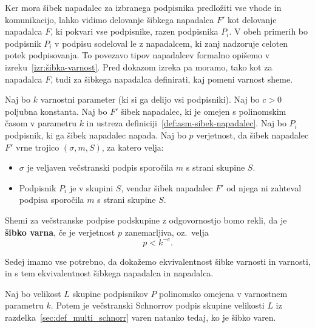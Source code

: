 \documentclass[isrm2, tisk]{fmfdelo}
\begin{document}
Ker mora šibek napadalec za izbranega podpisnika predložiti vse vhode in komunikacijo, lahko vidimo
delovanje šibkega napadalca $F'$ kot delovanje napadalca $F$, ki pokvari vse podpisnike, razen
podpisnika $P_i$. V obeh primerih bo podpisnik $P_i$ v podpisu sodeloval le z napadalcem, ki zanj
nadzoruje celoten potek podpisovanja. To povezavo tipov napadalcev formalno opišemo v
izreku~\ref{izr:šibka-varnost}. Pred dokazom izreka pa moramo, tako kot za napadalca $F$, tudi za
šibkega napadalca definirati, kaj pomeni varnost sheme.

\begin{definicija}
    Naj bo $k$ varnostni parameter (ki si ga delijo vsi podpisniki). Naj bo $c > 0$ poljubna konstanta. 
    Naj bo $F'$ šibek napadalec, ki je omejen s polinomskim časom v parametru $k$ in ustreza
    definiciji~\ref{def:asm-sibek-napadalec}. Naj bo $P_i$ podpisnik, ki ga šibek napadalec napada.
    Naj bo $p$ verjetnost, da šibek napadalec $F'$ vrne trojico $(\sigma, m, S)$, za katero velja: 
    \begin{itemize}
        \item $\sigma$ je veljaven večstranski podpis sporočila $m$ s strani skupine $S$.
        \item Podpisnik $P_i$ je v skupini $S$, vendar šibek napadalec $F'$ od njega ni zahteval
            podpisa sporočila $m$ s strani skupine $S$.
    \end{itemize}
    Shemi za večstranske podpise podskupine z odgovornostjo bomo rekli, da je \textbf{šibko varna},
    če je verjetnost $p$ zanemarljiva, oz.\ velja
    $$ 
    p < k^{-c}.
    $$
\end{definicija}

Sedej imamo vse potrebno, da dokažemo ekvivalentnost šibke varnosti in varnosti, in s tem
ekvivalentnost šibkega napadalca in napadalca.

\begin{izrek}
\label{izr:šibka-varnost}
    Naj bo velikost $L$ skupine podpisnikov $P$ polinomsko omejena v varnostnem parametru $k$.
    Potem je večstranski Schnorrov podpis skupine velikosti $L$ iz razdelka~\ref{sec:def_multi_schnorr}
    varen natanko tedaj, ko je šibko varen.
\end{izrek}
\end{document}
